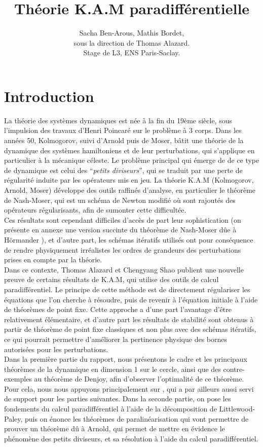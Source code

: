 \documentclass[11pt,a4paper]{article}
\title{\textbf{Théorie K.A.M paradifférentielle}}
\date{}
\author{Sacha Ben-Arous, Mathis Bordet, \\ sous la direction de Thomas Alazard.\\ Stage de L3, ENS Paris-Saclay.}
\begin{document}
\maketitle

\section{Introduction}
La théorie des systèmes dynamiques est née à la fin du 19ème siècle, sous l'impulsion des travaux d'Henri Poincaré sur le problème à 3 corps. Dans les années 50, Kolmogorov, suivi d'Arnold puis de Moser, bâtit une théorie de la dynamique des systèmes hamiltoniens et de leur perturbations, qui s'applique en particulier à la mécanique céleste. Le problème principal qui émerge de de ce type de dynamique est celui des ``\textit{petits diviseurs}'', qui se traduit par une perte de régularité induite par les opérateurs mis en jeu. La théorie K.A.M (Kolmogorov, Arnold, Moser) développe des outils raffinés d'analyse, en particulier le théorème de Nash-Moser, qui est un schéma de Newton modifié où sont rajoutés des opérateurs régularisants, afin de sumonter cette difficultée. \\
Ces résultats sont cependant difficiles d'accès de part leur sophistication (on présente en annexe une version succinte du théorème de Nash-Moser dûe à Hörmander \cite{hormander}), et d'autre part, les schémas itératifs utilisés ont pour conséquence de rendre physiquement irréalistes les ordres de grandeurs des perturbations prises en compte par la théorie. \\
Dans ce contexte, Thomas Alazard et Chengyang Shao publient une nouvelle preuve \cite{alazard} de certains résultats de K.A.M, qui utilise des outils de calcul paradifférentiel. Le principe de cette méthode est de directement régulariser les équations que l'on cherche à résoudre, puis de revenir à l'équation initiale à l'aide de théorèmes de point fixe. Cette approche a d'une part l'avantage d'être relativement élémentaire, et d'autre part les résultats de stabilité sont obtenus à partir de théorème de point fixe classiques et non plus avec des schémas itératifs, ce qui pourrait permettre d'améliorer la pertinence physique des bornes autorisées pour les perturbations. \\

Dans la première partie du rapport, nous présentons le cadre et les principaux théorèmes de la dynamique en dimension 1 sur le cercle, ainsi que des contre-exemples au théorème de Denjoy, afin d'observer l'optimalité de ce théorème. Pour cela, nous nous appuyons principalement sur \cite{dgv}, qui a par ailleurs aussi servi de support pour les parties suivantes. Dans la seconde partie, on pose les fondements du calcul paradifférentiel à l'aide de la décomposition de Littlewood-Paley, puis on énonce les théorèmes de paralinéarisation qui vont permettre de prouver un théorème dû à Arnold, qui permet de mettre en évidence le phénomène des petits diviseurs, et sa résolution à l'aide du calcul paradifférentiel.
\end{document}
